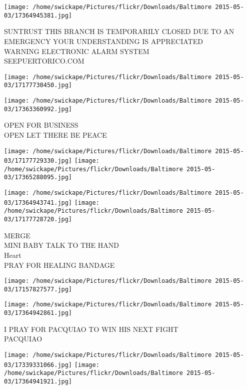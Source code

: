 \documentclass[10pt,letterpaper]{article}
\begin{document}
\texttt{[image: /home/swickape/Pictures/flickr/Downloads/Baltimore 2015-05-03/17364945381.jpg]}

SUNTRUST THIS BRANCH IS TEMPORARILY CLOSED DUE TO AN EMERGENCY YOUR UNDERSTANDING IS APPRECIATED\\
WARNING ELECTRONIC ALARM SYSTEM\\
SEEPUERTORICO.COM\\
\pagebreak

\texttt{[image: /home/swickape/Pictures/flickr/Downloads/Baltimore 2015-05-03/17177730450.jpg]}

\vspace{0.25in}
\texttt{[image: /home/swickape/Pictures/flickr/Downloads/Baltimore 2015-05-03/17363360992.jpg]}

OPEN FOR BUSINESS\\
OPEN LET THERE BE PEACE\\
\pagebreak

\texttt{[image: /home/swickape/Pictures/flickr/Downloads/Baltimore 2015-05-03/17177729330.jpg]}
\texttt{[image: /home/swickape/Pictures/flickr/Downloads/Baltimore 2015-05-03/17365288095.jpg]}

\texttt{[image: /home/swickape/Pictures/flickr/Downloads/Baltimore 2015-05-03/17364943741.jpg]}
\texttt{[image: /home/swickape/Pictures/flickr/Downloads/Baltimore 2015-05-03/17177728720.jpg]}

MERGE\\
MINI BABY TALK TO THE HAND\\
Heart\\
PRAY FOR HEALING BANDAGE\\
\pagebreak

\texttt{[image: /home/swickape/Pictures/flickr/Downloads/Baltimore 2015-05-03/17157827577.jpg]}

\vspace{0.25in}
\texttt{[image: /home/swickape/Pictures/flickr/Downloads/Baltimore 2015-05-03/17364942861.jpg]}

I PRAY FOR PACQUIAO TO WIN HIS NEXT FIGHT\\
PACQUIAO\\
\pagebreak

\texttt{[image: /home/swickape/Pictures/flickr/Downloads/Baltimore 2015-05-03/17339331066.jpg]}
\texttt{[image: /home/swickape/Pictures/flickr/Downloads/Baltimore 2015-05-03/17364941921.jpg]}
\end{document}

